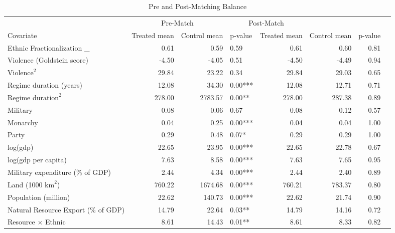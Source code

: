 \begin{sidewaystable}[ht]
\centering
\begin{tabular}{lrrlrrrl}
  \hline
 & \multicolumn{2}{c}{Pre-Match} &   \multicolumn{2}{c}{Post-Match} \\
Covariate & Treated mean & Control mean & p-value & Treated mean & Control mean & p-value &  \\ 
  \hline
Ethnic Fractionalization \_ & 0.61 & 0.59 & 0.59 & 0.61 & 0.60 & 0.81 &  \\ 
Violence (Goldstein score) & -4.50 & -4.05 & 0.51 & -4.50 & -4.49 & 0.94 &  \\ 
$\text{Violence}^2$ & 29.84 & 23.22 & 0.34 & 29.84 & 29.03 & 0.65 &  \\ 
Regime duration (years) & 12.08 & 34.30 & 0.00*** & 12.08 & 12.71 & 0.71 &  \\ 
$\text{Regime duration}^2$ & 278.00 & 2783.57 & 0.00** & 278.00 & 287.38 & 0.89 &  \\ 
Military & 0.08 & 0.06 & 0.67 & 0.08 & 0.12 & 0.57 &  \\ 
Monarchy & 0.04 & 0.25 & 0.00*** & 0.04 & 0.04 & 1.00 &  \\ 
Party & 0.29 & 0.48 & 0.07* & 0.29 & 0.29 & 1.00 &  \\ 
log(gdp) & 22.65 & 23.95 & 0.00*** & 22.65 & 22.78 & 0.67 &  \\ 
log(gdp per capita) & 7.63 & 8.58 & 0.00*** & 7.63 & 7.65 & 0.95 &  \\ 
Military expenditure (\% of GDP) & 2.44 & 4.34 & 0.00*** & 2.44 & 2.40 & 0.89 &  \\
Land (1000 $\text{km}^2$)& 760.22 & 1674.68 & 0.00*** & 760.21 & 783.37 & 0.80 &  \\ 
Population (million) & 22.62 & 140.73 & 0.00*** & 22.62 & 21.74 & 0.90 &  \\
Natural Resource Export (\% of GDP) & 14.79 & 22.64 & 0.03** & 14.79 & 14.16 & 0.72 &  \\ 
Resource $\times$ Ethnic & 8.61 & 14.43 & 0.01** & 8.61 & 8.33 & 0.82 &  \\ 
   \hline
\end{tabular}
\caption{Pre and Post-Matching Balance}
\label{tab:matching_balance_largen}
\end{sidewaystable}

